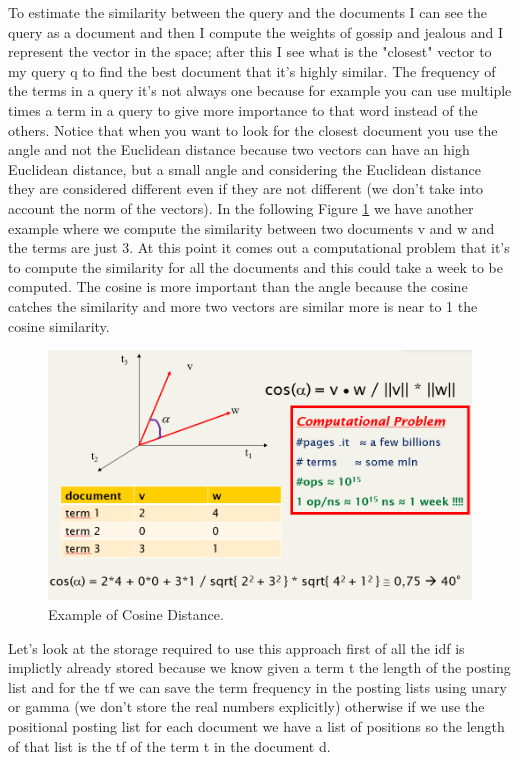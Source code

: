 To estimate the similarity between the query and the documents I can see the query as a document and then I compute the weights of gossip and jealous and I represent the vector in the space; after this I see what is the "closest" vector to my query q to find the best document that it's highly similar. The frequency of the terms in a query it's not always one because for example you can use multiple times a term in a query to give more importance to that word instead of the others.\newline
Notice that when you want to look for the closest document you use the angle and not the Euclidean distance because two vectors can have an high Euclidean distance, but a small angle and considering the Euclidean distance they are considered different even if they are not different (we don't take into account the norm of the vectors).\newline
In the following Figure \ref{fig:exampletfidf} we have another example where we compute the similarity between two documents v and w and the terms are just 3. At this point it comes out a computational problem that it's to compute the similarity for all the documents and this could take a week to be computed. The cosine is more important than the angle because the cosine catches the similarity and more two vectors are similar more is near to 1 the cosine similarity.\newline
\begin{figure}
    \centering
    \includegraphics[width=0.75\linewidth]{images/exampletfidf.PNG}
    \caption{Example of Cosine Distance.}
    \label{fig:exampletfidf}
\end{figure}
Let's look at the storage required to use this approach first of all the idf is implictly already stored because we know given a term t the length of the posting list and for the tf we can save the term frequency in the posting lists using unary or gamma (we don't store the real numbers explicitly) otherwise if we use the positional posting list for each document we have a list of positions so the length of that list is the tf of the term t in the document d.\newline
